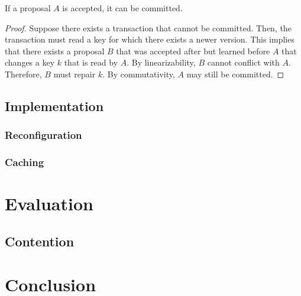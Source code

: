 \documentclass[../main.tex]{subfiles}
\begin{document}
  \begin{theorem}[Consistency]
    If a proposal $A$ is accepted, it can be committed.
  \end{theorem}
  \begin{proof}
    Suppose there exists a transaction that cannot be committed. Then, the transaction must read a
    key for which there exists a newer version. This implies that there exists a proposal $B$ that
    was accepted after but learned before $A$ that changes a key $k$ that is read by $A$. By
    linearizability, $B$ cannot conflict with $A$. Therefore, $B$ must repair $k$. By commutativity,
    $A$ may still be committed.
  \end{proof}

  \subsection{Implementation}

    \subsubsection{Reconfiguration}

    \subsubsection{Caching}

\section{Evaluation}

  \subsection{Contention}

\section{Conclusion}
\end{document}
